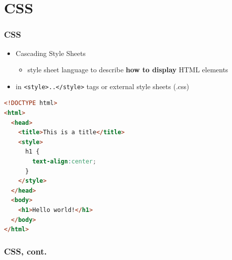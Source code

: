 \documentclass{beamer}
\begin{document}
\section{CSS} 
\begin{frame}[fragile]\frametitle{CSS} 

  \begin{itemize}
    \item Cascading Style Sheets
    \begin{itemize}
      \item style sheet language to describe \textbf{how to display} HTML elements 
    \end{itemize}
    \item in \texttt{<style>..</style>} tags or external style sheets (.css)
  \end{itemize}

  \begin{lstlisting}[language=html, escapechar={^}]
<!DOCTYPE html>
<html>
  <head>
    <title>This is a title</title>
    <style>
      h1 {
        text-align:center;
      }
    </style>
  </head>
  <body>
    <h1>Hello world!</h1>
  </body>
</html>
  \end{lstlisting}

\end{frame}




\begin{frame}[fragile]\frametitle{CSS, cont.} 

  

  

\end{frame}
\end{document}
